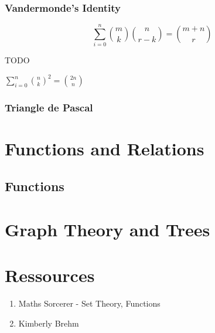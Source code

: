 \documentclass{article}
\begin{document}
\subsubsection{Vandermonde's Identity}%
\label{ssub:Vandermonde's Identity}

\begin{theorem}
    $$ \sum^{n}_{i=0} {m \choose k}{n \choose r-k}= {m+n \choose r} $$
\end{theorem}

\begin{intuition}
    TODO
\end{intuition}

\begin{corollary}
    $ \sum^{n}_{i=0} {n \choose k} ^2 = {2n \choose n} $
\end{corollary}

\subsubsection{Triangle de Pascal}%
\label{ssub:Triangle de Pascal}


\section{Functions and Relations}%
\label{sec:Functions and Relations}

\subsection{Functions}%
\label{sub:Functions}

\begin{defintion}[Functions]
\end{defintion}

\section{Graph Theory and Trees}

\section{Ressources}%
\label{sec:Ressources}

\begin{enumerate}
    \item Maths Sorcerer - Set Theory, Functions
    \item Kimberly Brehm
\end{enumerate}
\end{document}
